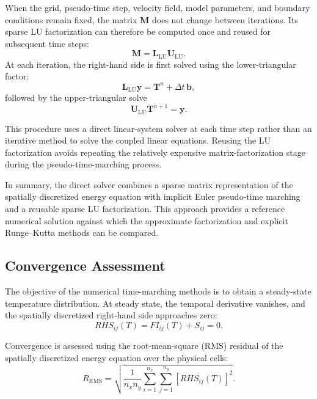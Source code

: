 When the grid, pseudo-time step, velocity field, model
parameters, and boundary conditions remain fixed, the matrix
$\mathbf{M}$ does not change between iterations. Its sparse
LU factorization can therefore be computed once and reused
for subsequent time steps:
\begin{equation}
\mathbf{M}=\mathbf{L}_{\mathrm{LU}}\mathbf{U}_{\mathrm{LU}}.
\label{eq:direct_lu_factorization}
\end{equation}
At each iteration, the right-hand side is first solved using
the lower-triangular factor:
\begin{equation}
\mathbf{L}_{\mathrm{LU}}\mathbf{y}
=
\mathbf{T}^{n}+\Delta t\,\mathbf{b},
\label{eq:direct_forward_substitution}
\end{equation}
followed by the upper-triangular solve
\begin{equation}
\mathbf{U}_{\mathrm{LU}}\mathbf{T}^{n+1}
=
\mathbf{y}.
\label{eq:direct_backward_substitution}
\end{equation}

This procedure uses a direct linear-system solver at each
time step rather than an iterative method to solve the
coupled linear equations. Reusing the LU factorization avoids
repeating the relatively expensive matrix-factorization
stage during the pseudo-time-marching process.

In summary, the direct solver combines a sparse matrix
representation of the spatially discretized energy equation
with implicit Euler pseudo-time marching and a reusable sparse
LU factorization. This approach provides a reference numerical
solution against which the approximate factorization and
explicit Runge--Kutta methods can be compared.

\subsection{Convergence Assessment}
\label{sec:convergence_assessment}

The objective of the numerical time-marching methods is to obtain
a steady-state temperature distribution. At steady state, the
temporal derivative vanishes, and the spatially discretized
right-hand side approaches zero:
\begin{equation}
RHS_{ij}(T)=FI_{ij}(T)+S_{ij}=0.
\label{eq:steady_state_equation}
\end{equation}

Convergence is assessed using the root-mean-square (RMS)
residual of the spatially discretized energy equation over
the physical cells:
\begin{equation}
\boxed{
R_{\mathrm{RMS}}
=
\sqrt{
\frac{1}{n_xn_y}
\sum_{i=1}^{n_x}
\sum_{j=1}^{n_y}
\left[RHS_{ij}(T)\right]^2
}.
}
\label{eq:rms_residual}
\end{equation}

